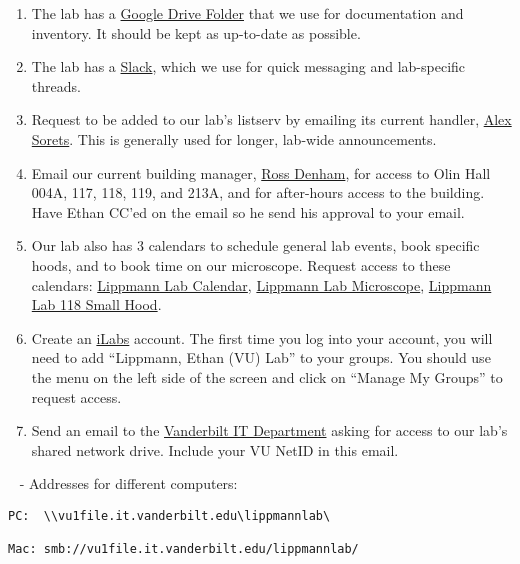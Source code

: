 \documentclass[
]{book}
\begin{document}
\begin{enumerate}
\def\labelenumi{\arabic{enumi}.}
\item
  The lab has a \href{https://drive.google.com/drive/folders/0Bwvn9S-4oeMmeHhzUS1nM0FNak0?usp=sharing}{Google Drive Folder} that we use for documentation and inventory. It should be kept as up-to-date as possible.
\item
  The lab has a \href{https://lippmann-lab.slack.com/join/signup\#/}{Slack}, which we use for quick messaging and lab-specific threads.
\item
  Request to be added to our lab's listserv by emailing its current handler, \href{mailto:alexander.g.sorets@vanderbilt.edu}{Alex Sorets}. This is generally used for longer, lab-wide announcements.
\item
  Email our current building manager, \href{mailto:ross.denham@vanderbilt.edu}{Ross Denham}, for access to Olin Hall 004A, 117, 118, 119, and 213A, and for after-hours access to the building. Have Ethan CC'ed on the email so he send his approval to your email.
\item
  Our lab also has 3 calendars to schedule general lab events, book specific hoods, and to book time on our microscope. Request access to these calendars: \href{https://calendar.google.com/calendar/u/0?cid=bXFkOWE3bjM3MTkxbzluYWVtbWw0NDd2bGtAZ3JvdXAuY2FsZW5kYXIuZ29vZ2xlLmNvbQ}{Lippmann Lab Calendar}, \href{https://calendar.google.com/calendar/u/0?cid=ZjNkMXBkbmFwZzc0NWR2YmVmNXU0bGN1YjBAZ3JvdXAuY2FsZW5kYXIuZ29vZ2xlLmNvbQ}{Lippmann Lab Microscope}, \href{https://calendar.google.com/calendar/u/0?cid=MGk3NGZpdm5ua2JyZjMyc2duNTE2aGMxOWdAZ3JvdXAuY2FsZW5kYXIuZ29vZ2xlLmNvbQ}{Lippmann Lab 118 Small Hood}.
\item
  Create an \href{https://vanderbilt.corefacilities.org/landing/2191}{iLabs} account. The first time you log into your account, you will need to add ``Lippmann, Ethan (VU) Lab'' to your groups. You should use the menu on the left side of the screen and click on ``Manage My Groups'' to request access.
\item
  Send an email to the \href{mailto:dts.se.support@Vanderbilt.Edu}{Vanderbilt IT Department} asking for access to our lab's shared network drive. Include your VU NetID in this email.
\end{enumerate}

~ - Addresses for different computers:

\begin{verbatim}
PC:  \\vu1file.it.vanderbilt.edu\lippmannlab\

Mac: smb://vu1file.it.vanderbilt.edu/lippmannlab/
\end{verbatim}
\end{document}
